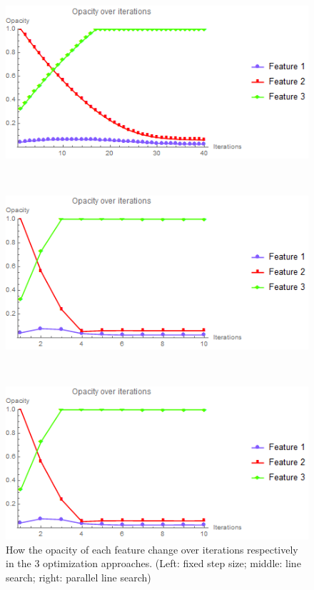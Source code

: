 \begin{figure}
	\centering
	\begin{minipage}{.33\textwidth}
		\includegraphics[width=1\linewidth]{images/nucleon_strong_red_opacity_fixed}
	\end{minipage}~
	\begin{minipage}{.33\textwidth}
		\includegraphics[width=1\linewidth]{images/nucleon_strong_red_opacity_linesearch}
	\end{minipage}~
	\begin{minipage}{.33\textwidth}
		\includegraphics[width=1\linewidth]{images/nucleon_strong_red_opacity_parallelsearch}
	\end{minipage}
	\caption{How the opacity of each feature change over iterations respectively in the 3 optimization approaches. (Left: fixed step size; middle: line search; right: parallel line search)}
	\label{fig:nucleon_strong_red_opacity}
\end{figure}

